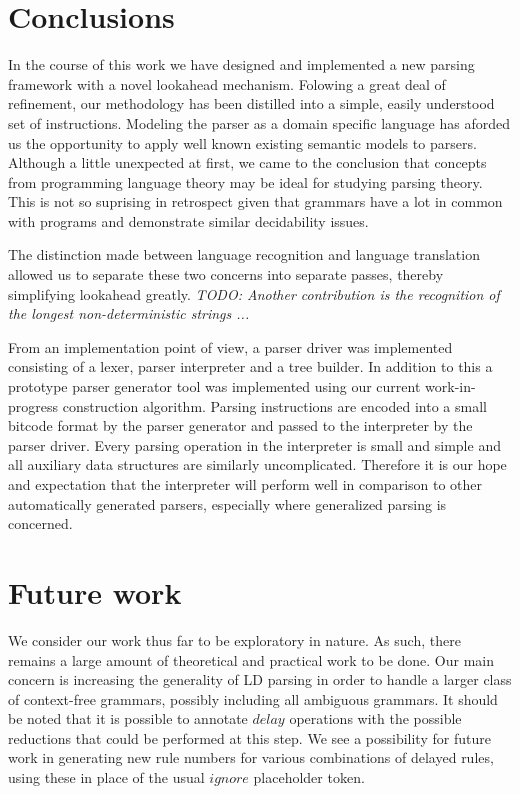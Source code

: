 \documentclass[a4paper,11pt]{article}
\begin{document}
\section*{Conclusions}

In the course of this work we have designed and implemented a new parsing framework with a novel lookahead mechanism.
Folowing a great deal of refinement, our methodology has been distilled into a simple, easily understood set of instructions.
Modeling the parser as a domain specific language has aforded us the opportunity to apply well known existing semantic models to parsers.
Although a little unexpected at first, we came to the conclusion that concepts from programming language theory may be ideal for studying parsing theory.
This is not so suprising in retrospect given that grammars have a lot in common with programs and demonstrate similar decidability issues.

The distinction made between language recognition and language translation allowed us to separate these two concerns into separate passes, 
thereby simplifying lookahead greatly. \emph{TODO: Another contribution is the recognition of the longest non-deterministic strings ...}

From an implementation point of view, a parser driver was implemented consisting of a lexer, parser interpreter and a tree builder.
In addition to this a prototype parser generator tool was implemented using our current work-in-progress construction algorithm.
Parsing instructions are encoded into a small bitcode format by the parser generator and passed to the interpreter by the parser driver.
Every parsing operation in the interpreter is small and simple and all auxiliary data structures are similarly uncomplicated. 
Therefore it is our hope and expectation that the interpreter will perform well in comparison to other automatically generated parsers, especially where generalized parsing is concerned.

\section*{Future work}

We consider our work thus far to be exploratory in nature.
As such, there remains a large amount of theoretical and practical work to be done.
Our main concern is increasing the generality of LD parsing in order to handle a larger class of context-free grammars, possibly including all ambiguous grammars. 
It should be noted that it is possible to annotate $delay$ operations with the possible reductions that could be performed at this step.
We see a possibility for future work in generating new rule numbers for various combinations of delayed rules, using these in place of the usual $ignore$ placeholder token.
\end{document}
